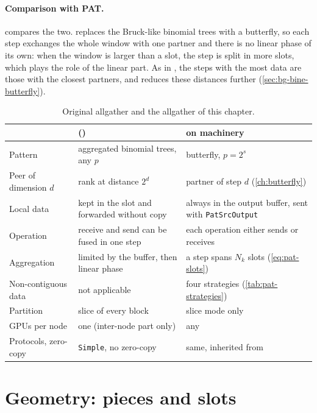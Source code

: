 \paragraph{Comparison with PAT.}
 compares the two.
\bine{} replaces the Bruck-like binomial trees with a butterfly, so each step exchanges the whole window with one partner and there is no linear phase of its own: when the window is larger than a slot, the step is split in more slots, which plays the role of the linear part.
As in \pat{}, the steps with the most data are those with the closest partners, and \bine{} reduces these distances further (\cref{sec:bg-bine-butterfly}).

\begin{table}[t]
\centering
\footnotesize
\setlength{\tabcolsep}{4pt}
\caption{Original \pat{} allgather and the \bine{} allgather of this chapter.}
\label{tab:pat-vs-bine}
\begin{tabularx}{\linewidth}{@{}l X X@{}}
\toprule
 & \pat{} (\nccl{}) & \bine{} on \pat{} machinery \\
\midrule
Pattern & aggregated binomial trees, any $p$ & \bine{} butterfly, $p=2^s$ \\
Peer of dimension $d$ & rank at distance $2^d$ & partner of step $d$ (\cref{ch:butterfly}) \\
Local data & kept in the slot and forwarded without copy & always in the output buffer, sent with \texttt{PatSrcOutput} \\
Operation & receive and send can be fused in one step & each operation either sends or receives \\
Aggregation & limited by the buffer, then linear phase & a step spans $N_k$ slots (\cref{eq:pat-slots}) \\
Non-contiguous data & not applicable & four strategies (\cref{tab:pat-strategies}) \\
Partition & slice of every block & slice mode only \\
GPUs per node & one (inter-node part only) & any \\
Protocols, zero-copy & \texttt{Simple}, no zero-copy & same, inherited from \pat{} \\
\bottomrule
\end{tabularx}
\end{table}

\section{Geometry: pieces and slots}\label{sec:pat-geom}

